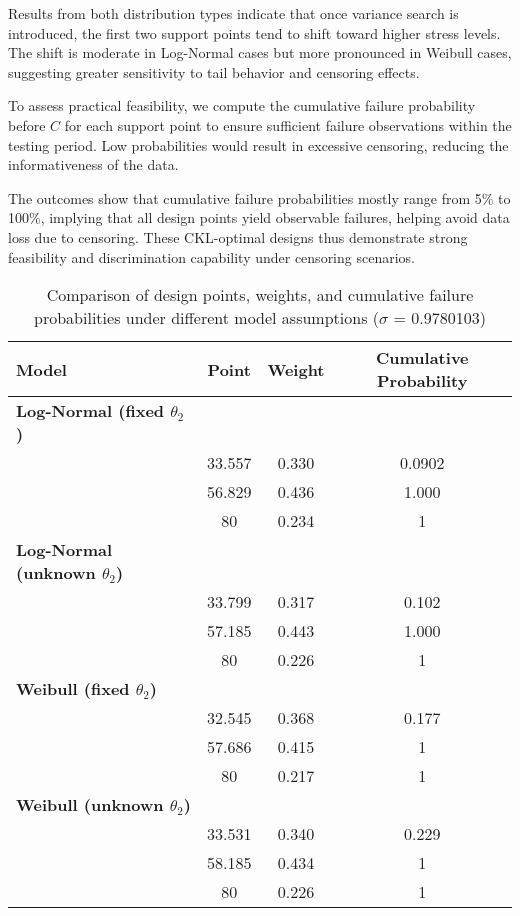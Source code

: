 \hspace*{8mm} Results from both distribution types indicate that once variance search is introduced, the first two support points tend to shift toward higher stress levels. The shift is moderate in Log-Normal cases but more pronounced in Weibull cases, suggesting greater sensitivity to tail behavior and censoring effects.

\hspace*{8mm} To assess practical feasibility, we compute the cumulative failure probability before $C$ for each support point to ensure sufficient failure observations within the testing period. Low probabilities would result in excessive censoring, reducing the informativeness of the data.

\hspace*{8mm} The outcomes show that cumulative failure probabilities mostly range from 5\% to 100\%, implying that all design points yield observable failures, helping avoid data loss due to censoring. These CKL-optimal designs thus demonstrate strong feasibility and discrimination capability under censoring scenarios.

\begin{table}[H] \scriptsize
\caption{Comparison of design points, weights, and cumulative failure probabilities under different model assumptions ($\sigma$ = 0.9780103)}
\label{tab:design_comparison0.98}
\centering
\renewcommand{\arraystretch}{1.44}
\begin{tabular}{lccc}
\toprule
\textbf{Model} & \textbf{Point} & \textbf{Weight} & \textbf{Cumulative Probability} \\
\midrule
\textbf{Log-Normal (fixed $\theta_2$)} & & & \\
\quad & 33.557 & 0.330 & 0.0902 \\
\quad & 56.829 & 0.436 & 1.000 \\
\quad & 80 & 0.234 & 1\\
\addlinespace
\textbf{Log-Normal (unknown $\theta_2$)} & & & \\
\quad & 33.799 & 0.317 & 0.102 \\
\quad & 57.185 & 0.443 & 1.000 \\
\quad & 80 & 0.226 & 1 \\
\addlinespace
\textbf{Weibull (fixed $\theta_2$)} & & & \\
\quad & 32.545 & 0.368 & 0.177 \\
\quad & 57.686 & 0.415 & 1 \\
\quad & 80 & 0.217 & 1 \\
\addlinespace
\textbf{Weibull (unknown $\theta_2$)} & & & \\
\quad & 33.531 & 0.340 & 0.229 \\
\quad & 58.185 & 0.434 & 1 \\
\quad & 80 & 0.226 & 1 \\
\bottomrule
\end{tabular}
\end{table}

